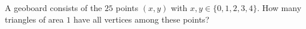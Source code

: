 A geoboard consists of the $25$ points $(x,y)$ with $x,y\in\{0,1,2,3,4\}$. How many triangles of area $1$ have all vertices among these points?
